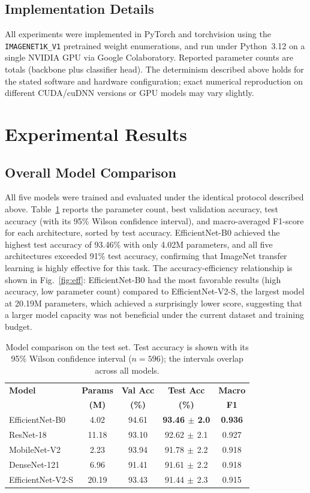 \documentclass[ASNA, twocolumn]{USG}
\begin{document}
\subsection{Implementation Details}
All experiments were implemented in PyTorch and torchvision using the \texttt{IMAGENET1K\_V1} pretrained weight enumerations, and run under Python~3.12 on a single NVIDIA GPU via Google Colaboratory. Reported parameter counts are totals (backbone plus classifier head). The determinism described above holds for the stated software and hardware configuration; exact numerical reproduction on different CUDA/cuDNN versions or GPU models may vary slightly.

\section{Experimental Results}

\subsection{Overall Model Comparison}
All five models were trained and evaluated under the identical protocol described above. Table~\ref{tab:model_comparison} reports the parameter count, best validation accuracy, test accuracy (with its 95\% Wilson confidence interval), and macro-averaged F1-score for each architecture, sorted by test accuracy. EfficientNet-B0 achieved the highest test accuracy of 93.46\% with only 4.02M parameters, and all five architectures exceeded 91\% test accuracy, confirming that ImageNet transfer learning is highly effective for this task. The accuracy-efficiency relationship is shown in Fig.~\ref{fig:eff}: EfficientNet-B0 had the most favorable results (high accuracy, low parameter count) compared to EfficientNet-V2-S, the largest model at 20.19M parameters, which achieved a surprisingly lower score, suggesting that a larger model capacity was not beneficial under the current dataset and training budget.

\begin{table}[htbp]
\caption{Model comparison on the test set. Test accuracy is shown with its 95\% Wilson confidence interval ($n=596$); the intervals overlap across all models.}
\label{tab:model_comparison}
\centering
\begin{tabular}{lcccc}
\toprule
\textbf{Model} & \textbf{Params} & \textbf{Val Acc} & \textbf{Test Acc} & \textbf{Macro} \\
 & \textbf{(M)} & \textbf{(\%)} & \textbf{(\%)} & \textbf{F1} \\
\midrule
EfficientNet-B0   & 4.02  & 94.61 & \textbf{93.46$\,\pm\,$2.0} & \textbf{0.936} \\
ResNet-18         & 11.18 & 93.10 & 92.62$\,\pm\,$2.1 & 0.927 \\
MobileNet-V2      & 2.23  & 93.94 & 91.78$\,\pm\,$2.2 & 0.918 \\
DenseNet-121      & 6.96  & 91.41 & 91.61$\,\pm\,$2.2 & 0.918 \\
EfficientNet-V2-S & 20.19 & 93.43 & 91.44$\,\pm\,$2.3 & 0.915 \\
\bottomrule
\end{tabular}
\end{table}
\end{document}
